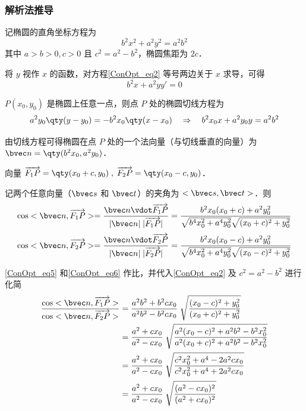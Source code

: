\subsubsection{解析法推导}
记椭圆的直角坐标方程为
\begin{equation}\label{ConOpt_eq2}
b^2 x^2 +a^2 y^2=a^2 b^2
\end{equation}
其中 $a>b>0,c>0$ 且 $c^2=a^2-b^2$，椭圆焦距为 $2c$．

将 $y$ 视作 $x$ 的函数，对方程\autoref{ConOpt_eq2} 等号两边关于 $x$ 求导，可得
\begin{equation}
b^2 x +a^2 yy'= 0
\end{equation}

$P(x_0,y_0)$ 是椭圆上任意一点，则点 $P$ 处的椭圆切线方程为
\begin{equation}
a^2 y_0 \qty(y - y_0) = - b^2 x_0 \qty(x - x_0) \quad
\Rightarrow \quad
b^2 x_0 x + a^2 y_0 y = a^2 b^2
\end{equation}

由切线方程可得椭圆在点 $P$ 处的一个法向量（与切线垂直的向量）为 $\bvec n = \qty(b^2 x_0,a^2 y_0)$．

向量 $\overrightarrow{F_1P}=\qty(x_0 +c,y_0)\; ,\; \overrightarrow{F_2P}=\qty(x_0 -c,y_0)$．

记两个任意向量（$\bvec s$ 和 $\bvec t$）的夹角为 $<\bvec s,\bvec t>$．则
\begin{equation}\label{ConOpt_eq5}
\cos<\bvec n,\overrightarrow{F_1P}>=\frac{\bvec n \vdot \overrightarrow{F_1P}}{|\bvec n| \; |\overrightarrow{F_1P}|}= \frac{b^2 x_0 (x_0+c)+a^2 y_0^2}{\sqrt{b^4 x_0^2+a^4 y_0^2}\sqrt{(x_0+c)^2+y_0^2}}
\end{equation}
\begin{equation}\label{ConOpt_eq6}
\cos<\bvec n,\overrightarrow{F_2P}>=\frac{\bvec n \vdot \overrightarrow{F_2P}}{|\bvec n| \; |\overrightarrow{F_2P}|}= \frac{b^2 x_0 (x_0-c)+a^2 y_0^2}{\sqrt{b^4 x_0^2+a^4 y_0^2}\sqrt{(x_0-c)^2+y_0^2}}
\end{equation}

\autoref{ConOpt_eq5} 和\autoref{ConOpt_eq6} 作比，并代入\autoref{ConOpt_eq2} 及 $c^2=a^2-b^2$ 进行化简
\begin{equation}
\begin{aligned}
\frac{\cos<\bvec n,\overrightarrow{F_1P}>}{\cos<\bvec n,\overrightarrow{F_2P}>} &=\frac{a^2 b^2+b^2cx_0}{a^2 b^2-b^2cx_0}\; \sqrt{\frac{(x_0-c)^2+y_0^2}{(x_0+c)^2+y_0^2}} \\
&=\frac{a^2+cx_0}{a^2-cx_0}\; \sqrt{\frac{a^2(x_0-c)^2 +a^2 b^2-b^2 x_0^2}{a^2(x_0+c)^2 +a^2 b^2-b^2 x_0^2}} \\
&=\frac{a^2+cx_0}{a^2-cx_0}\; \sqrt{\frac{c^2 x_0^2 + a^4 - 2a^2 c x_0}{c^2 x_0^2 + a^4 + 2a^2 c x_0}} \\
&=\frac{a^2+cx_0}{a^2-cx_0}\; \sqrt{\frac{(a^2-cx_0)^2}{(a^2+cx_0)^2}}
\end{aligned}
\end{equation}

